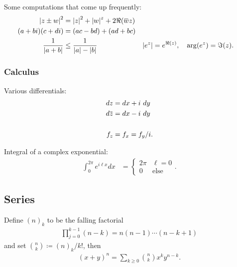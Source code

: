 \begin{fact}

Some computations that come up frequently:
\begin{align*}
{\left\lvert {z \pm w} \right\rvert}^2 &= {\left\lvert {z} \right\rvert}^2 + {\left\lvert {w} \right\rvert}^z + 2\Re(\mkern 1.5mu\overline{\mkern-1.5muw\mkern-1.5mu}\mkern 1.5muz) \\
(a+bi)(c+di) &= (ac - bd) + (ad + bc) \\
{1\over {\left\lvert {a+b} \right\rvert}} &\leq {1 \over {{\left\lvert {a} \right\rvert} - {\left\lvert {b} \right\rvert}}} &&
{\left\lvert {e^{z}} \right\rvert} = e^{\Re(z)}, \quad \arg(e^z) = \Im(z)
.\end{align*}

\end{fact}

\hypertarget{calculus}{%
\subsubsection{Calculus}\label{calculus}}

\begin{fact}

Various differentials:
\begin{align*}
dz &= dx + i~dy \\
d\mkern 1.5mu\overline{\mkern-1.5muz\mkern-1.5mu}\mkern 1.5mu &= dx - i~dy \\ \\
f_z &= f_x = f_y / i
.\end{align*}

Integral of a complex exponential:
\begin{align*}
\int_{0}^{2 \pi} e^{i \ell x} d x
&=\left\{\begin{array}{ll}
{2 \pi} & {\ell=0} \\ 
{0} & \text{else}
\end{array}\right.
.\end{align*}

\end{fact}

\hypertarget{series}{%
\subsection{Series}\label{series}}

\begin{fact}

Define \((n)_k\) to be the falling factorial
\begin{align*}
\prod_{j=0}^{k-1} (n-k) = n(n-1)\cdots(n-k+1)
\end{align*}
and set \({n\choose k} \coloneqq(n)_k/k!\), then
\begin{align*}
(x+y)^n = \sum_{k\geq 0} {n\choose k} x^{k}y^{n-k}
.\end{align*}

\end{fact}


